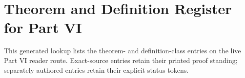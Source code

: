 \section*{Theorem and Definition Register for Part VI}
\label{sec:p06-theorem-definition-register}

This generated lookup lists the theorem- and definition-class entries on the
live Part VI reader route. Exact-source entries retain their printed proof
standing; separately authored entries retain their explicit status tokens.

